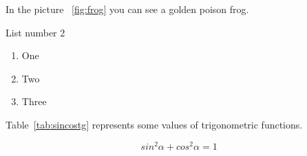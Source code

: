 In the picture ~\ref{fig:frog} you can see a golden poison frog.

List number 2
\begin{enumerate}
    \item One
    \item Two
    \item Three
\end{enumerate}

\begin{center}

Table~\ref{tab:sincostg} represents some values of trigonometric functions.
\end{center}

\[sin^2\alpha + cos^2\alpha = 1\]




